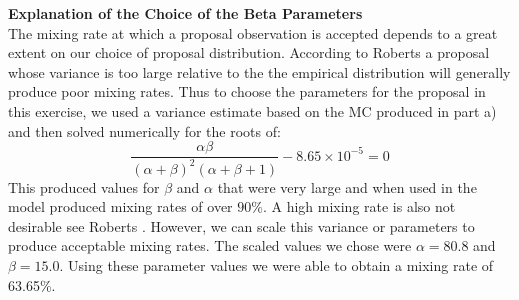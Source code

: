\documentclass[12pt,a4paper]{article}
\begin{document}
\textbf{Explanation of the Choice of the Beta Parameters}\\
The mixing rate at which a proposal observation is accepted depends to a great extent on our choice of proposal distribution. According to Roberts \cite{roberts2004general} a proposal whose variance is too large relative to the the empirical distribution will generally produce poor mixing rates. Thus to choose the parameters for the proposal in this exercise, we used a variance estimate based on the MC produced in part a) and then solved numerically for the roots of:
\[\dfrac{\alpha\beta}{(\alpha+\beta)^2(\alpha+\beta+1)}-	8.65\times 10^{-5}=0\]
This produced values for $\beta$ and $\alpha$ that were very large and when used in the model produced mixing rates of over $90\%$. A high mixing rate is also not desirable see Roberts \cite{roberts1997weak}. However, we can scale this variance or parameters to produce acceptable mixing rates. The scaled values we chose were $\alpha=80.8$ and $\beta=15.0$. Using these parameter values we were able to obtain a mixing rate of 63.65\%.
\clearpage
\end{document}
